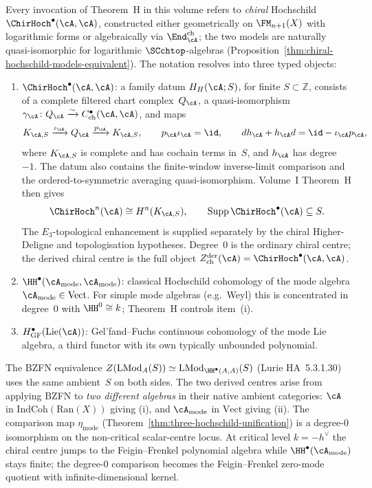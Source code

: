 \begin{remark}%
\label{rem:thm-H-three-way-scope}%
%
%
Every invocation of Theorem~H in this volume refers to \emph{chiral} Hochschild
$\ChirHoch^\bullet(\cA,\cA)$, constructed either geometrically on $\FM_{n+1}(X)$ with
logarithmic forms or algebraically via $\End^{\mathrm{ch}}_\cA$; the two models are
naturally quasi-isomorphic for logarithmic $\SCchtop$-algebras
(Proposition~\ref{thm:chiral-hochschild-models-equivalent}). The
notation resolves into three typed objects:
\begin{enumerate}
 \item[\textup{(i)}] $\ChirHoch^\bullet(\cA,\cA)$: a family datum
 $H_H(\cA;S)$, for finite $S\subset\mathbb Z$, consists of a complete
 filtered chart complex~$Q_\cA$, a
 quasi-isomorphism
 $\gamma_\cA\colon Q_\cA\xrightarrow{\sim}
 C^\bullet_{\mathrm{ch}}(\cA,\cA)$, and maps
 \[
 K_{\cA,S}\xrightarrow{\iota_\cA}Q_\cA
 \xrightarrow{p_\cA}K_{\cA,S},
 \qquad
 p_\cA\iota_\cA=\id,
 \qquad
 d h_\cA+h_\cA d=\id-\iota_\cA p_\cA,
 \]
 where $K_{\cA,S}$ is complete and has cochain terms in~$S$, and
 $h_\cA$ has degree~$-1$.
 The datum also contains the finite-window inverse-limit comparison
 and the ordered-to-symmetric averaging quasi-isomorphism. Volume~I
 Theorem~H then gives
 \[
  \ChirHoch^n(\cA)\cong H^n(K_{\cA,S}),
  \qquad
  \operatorname{Supp}\ChirHoch^\bullet(\cA)\subseteq S.
 \]
 The $E_3$-topological enhancement is supplied separately by the
 chiral Higher-Deligne and topologisation hypotheses.  Degree~$0$ is
 the ordinary chiral centre; the derived chiral centre is the full
 object
 $Z^{\mathrm{der}}_{\mathrm{ch}}(\cA)=\ChirHoch^\bullet(\cA,\cA)$.
 \item[\textup{(ii)}] $\HH^\bullet(\cA_{\mathrm{mode}},\cA_{\mathrm{mode}})$:
 classical Hochschild cohomology of the mode algebra $\cA_{\mathrm{mode}}\in\mathrm{Vect}$.
 For simple mode algebras (e.g.\ Weyl) this is concentrated in degree~$0$ with
 $\HH^0\cong k$; Theorem~H controls item~\textup{(i)}.
 \item[\textup{(iii)}] $H^\bullet_{\mathrm{GF}}(\mathrm{Lie}(\cA))$:
 Gel'fand--Fuchs continuous cohomology of the mode Lie algebra, a third
 functor with its own typically unbounded polynomial.
\end{enumerate}
The BZFN equivalence $Z(\mathrm{LMod}_A(S))\simeq\mathrm{LMod}_{\HH^\bullet(A,A)}(S)$
\textup{(}Lurie HA~5.3.1.30\textup{)} uses the same ambient~$S$ on
both sides. The two derived centres arise from applying BZFN to
\emph{two different algebras} in their native ambient
categories: $\cA$ in $\mathrm{IndCoh}(\mathrm{Ran}(X))$ giving (i), and
$\cA_{\mathrm{mode}}$ in $\mathrm{Vect}$ giving (ii). The comparison
map $\eta_{\mathrm{mode}}$
\textup{(}Theorem~\ref{thm:three-hochschild-unification}\textup{)}
is a degree-$0$ isomorphism on the non-critical scalar-centre
locus. At critical level $k=-h^\vee$ the chiral centre jumps to the
Feigin--Frenkel polynomial algebra while
$\HH^\bullet(\cA_{\mathrm{mode}})$ stays finite; the degree-$0$
comparison becomes the Feigin--Frenkel zero-mode quotient with
infinite-dimensional kernel.
\end{remark}


